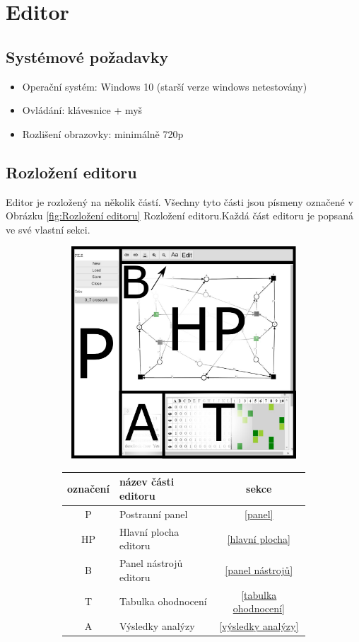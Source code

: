 \documentclass[
  biblatex,
  glossaries,
  index
]{kidiplom}
\begin{document}
\clearpage
\section{Editor}
\subsection{Systémové požadavky}
\begin{itemize}
  \item Operační systém: Windows 10 (starší verze windows netestovány)
  \item Ovládání: klávesnice + myš
  \item Rozlišení obrazovky: minimálně 720p
\end{itemize}

  
\subsection{Rozložení editoru}
Editor je rozložený na několik částí. Všechny tyto části 
jsou písmeny označené v Obrázku \ref{fig:Rozložení editoru} 
Rozložení editoru.Každá část editoru je popsaná ve své vlastní sekci.

\begin{figure}[h]
  \centering
  \begin{subfigure}[h]{350px}
    \includegraphics[height=300px, width=350px]{full_image_splited}
  \end{subfigure}
  \caption{Rozložení editoru}
  \label{fig:Rozložení editoru}
  \begin{subfigure}[h]{0.55\textwidth}
    \begin{tabular}{|c l c|}
      \hline
      označení &      název části editoru &    sekce \\
      \hline
      \hline
      P &             Postranní panel&  \ref{panel} \\
      HP &            Hlavní plocha editoru&  \ref{hlavní plocha} \\
      B &             Panel nástrojů editoru &  \ref{panel nástrojů} \\
      T &             Tabulka ohodnocení &  \ref{tabulka ohodnocení} \\
      A &             Výsledky analýzy &  \ref{výsledky analýzy} \\
      \hline
    \end{tabular}
  \end{subfigure}
\end{figure}
\end{document}

